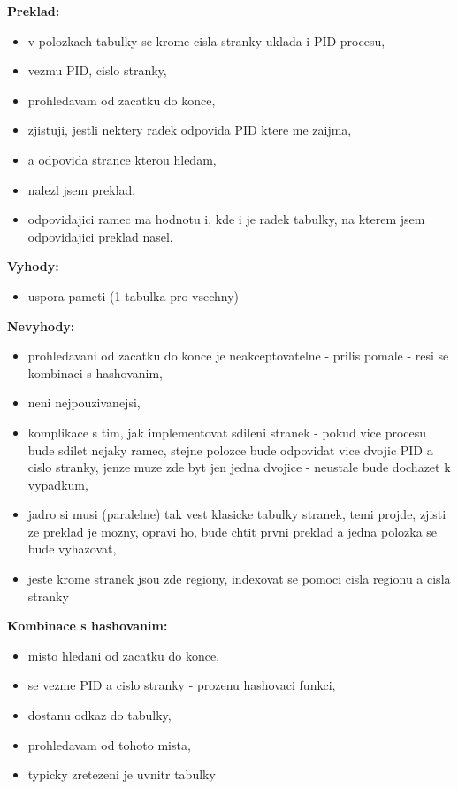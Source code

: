 \documentclass[a4paper, 11pt]{article}
\begin{document}
\textbf{Preklad:}
\begin{itemize}
    \item v polozkach tabulky se krome cisla stranky uklada i PID procesu,
    \item vezmu PID, cislo stranky,
    \item prohledavam od zacatku do konce,
    \item zjistuji, jestli nektery radek odpovida PID ktere me zaijma,
    \item a odpovida strance kterou hledam,
    \item nalezl jsem preklad,
    \item odpovidajici ramec ma hodnotu i, kde i je radek tabulky, na kterem jsem odpovidajici preklad nasel, \\
\end{itemize}

\textbf{Vyhody:}
\begin{itemize}
    \item uspora pameti (1 tabulka pro vsechny) \\
\end{itemize}

\textbf{Nevyhody:}
\begin{itemize}
    \item prohledavani od zacatku do konce je neakceptovatelne - prilis pomale - resi se kombinaci s hashovanim,
    \item neni nejpouzivanejsi,
    \item komplikace s tim, jak implementovat sdileni stranek - pokud vice procesu bude sdilet nejaky ramec, stejne polozce bude odpovidat vice dvojic PID a cislo stranky, jenze muze zde byt jen jedna dvojice - neustale bude dochazet k vypadkum,
    \item jadro si musi (paralelne) tak vest klasicke tabulky stranek, temi projde, zjisti ze preklad je mozny, opravi ho, bude chtit prvni preklad a jedna polozka se bude vyhazovat,
    \item jeste krome stranek jsou zde regiony, indexovat se pomoci cisla regionu a cisla stranky \\
\end{itemize}

\textbf{Kombinace s hashovanim:}
\begin{itemize}
    \item misto hledani od zacatku do konce,
    \item se vezme PID a cislo stranky - prozenu hashovaci funkci,
    \item dostanu odkaz do tabulky,
    \item prohledavam od tohoto mista,
    \item typicky zretezeni je uvnitr tabulky \\
\end{itemize}
\end{document}
